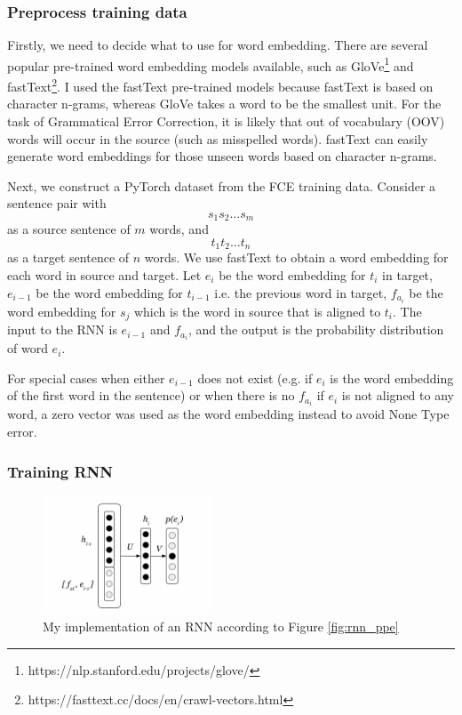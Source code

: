 \documentclass[12pt,a4paper,twoside]{report}
\begin{document}
\subsubsection{Preprocess training data}
Firstly, we need to decide what to use for word embedding. There are several popular pre-trained word embedding models available, such as GloVe\footnote{https://nlp.stanford.edu/projects/glove/} and fastText\footnote{https://fasttext.cc/docs/en/crawl-vectors.html}. I used the fastText pre-trained models because fastText is based on character n-grams, whereas GloVe takes a word to be the smallest unit. For the task of Grammatical Error Correction, it is likely that out of vocabulary (OOV) words will occur in the source (such as misspelled words). fastText can easily generate word embeddings for those unseen words based on character n-grams.

Next, we construct a PyTorch dataset from the FCE training data. Consider a sentence pair with
\[s_1s_2\dots s_m\]
as a source sentence of $m$ words, and
\[t_1t_2\dots t_n\]
as a target sentence of $n$ words. We use fastText to obtain a word embedding for each word in source and target. Let $e_i$ be the word embedding for $t_i$ in target, $e_{i-1}$ be the word embedding for $t_{i-1}$ i.e. the previous word in target, $f_{a_i}$ be the word embedding for $s_j$ which is the word in source that is aligned to $t_i$. The input to the RNN is $e_{i-1}$ and $f_{a_i}$, and the output is the probability distribution of word $e_i$.

For special cases when either $e_{i-1}$ does not exist (e.g. if $e_i$ is the word embedding of the first word in the sentence) or when there is no $f_{a_i}$ if $e_i$ is not aligned to any word, a zero vector was used as the word embedding instead to avoid None Type error.

\subsubsection{Training RNN}

\begin{figure}[ht]
\centering
\includegraphics[width=0.45\textwidth]{images/rnn_code.png}
\caption{My implementation of an RNN according to Figure \ref{fig:rnn_ppe}}
\label{fig:rnn_code}
\end{figure}
\end{document}
